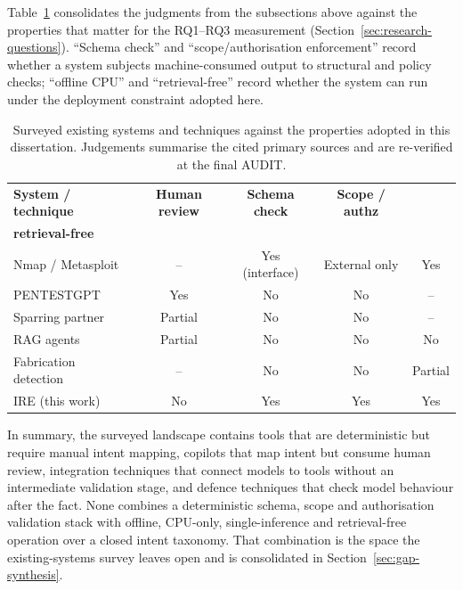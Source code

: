 Table~\ref{tab:existing-systems} consolidates the judgments from the subsections above against the properties that matter for the RQ1--RQ3
measurement (Section~\ref{sec:research-questions}). ``Schema check'' and
``scope/authorisation enforcement'' record whether a system subjects
machine-consumed output to structural and policy checks; ``offline CPU'' and
``retrieval-free'' record whether the system can run under the deployment
constraint adopted here.

\begin{table}[h]
\centering
\footnotesize
\caption{Surveyed existing systems and techniques against the properties adopted in this dissertation. Judgements summarise the cited primary sources and are re-verified at the final AUDIT.}
\label{tab:existing-systems}
\begin{tabular}{@{}lcccc@{}}
\hline
\textbf{System / technique} & \textbf{Human review} & \textbf{Schema check} & \textbf{Scope / authz} & \shortstack{\textbf{Offline CPU}\\\textbf{retrieval-free}} \\
\hline
Nmap / Metasploit & -- & Yes (interface) & External only & Yes \\
PENTESTGPT & Yes & No & No & -- \\
Sparring partner & Partial & No & No & -- \\
RAG agents & Partial & No & No & No \\
Fabrication detection & -- & No & No & Partial \\
IRE (this work) & No & Yes & Yes & Yes \\
\hline
\end{tabular}
\end{table}

In summary, the surveyed landscape contains tools that are deterministic but
require manual intent mapping, copilots that map intent but consume human review,
integration techniques that connect models to tools without an intermediate
validation stage, and defence techniques that check model behaviour after the
fact. None combines a deterministic schema, scope and authorisation validation
stack with offline, CPU-only, single-inference and retrieval-free operation over
a closed intent taxonomy. That combination is the space the existing-systems
survey leaves open and is consolidated in Section~\ref{sec:gap-synthesis}.



